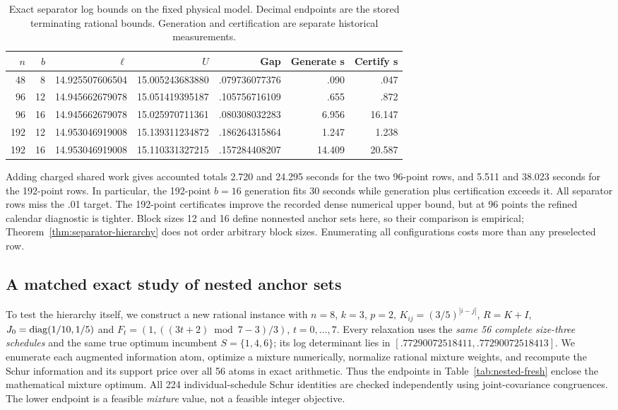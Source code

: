 \begin{table}[htbp]
\centering\small
\caption{Exact separator log bounds on the fixed physical model. Decimal
endpoints are the stored terminating rational bounds. Generation and
certification are separate historical measurements.}
\label{tab:separator-certificates}
\begin{tabular}{rrrrrrr}
\toprule
$n$ & $b$ & $\ell$ & $U$ & Gap & Generate s & Certify s\\
\midrule
48&8&14.925507606504&15.005243683880&.079736077376&.090&.047\\
96&12&14.945662679078&15.051419395187&.105756716109&.655&.872\\
96&16&14.945662679078&15.025970711361&.080308032283&6.956&16.147\\
192&12&14.953046919008&15.139311234872&.186264315864&1.247&1.238\\
192&16&14.953046919008&15.110331327215&.157284408207&14.409&20.587\\
\bottomrule
\end{tabular}
\end{table}

Adding charged shared work gives accounted totals 2.720 and 24.295 seconds
for the two 96-point rows, and 5.511 and 38.023 seconds for the 192-point rows.
In particular, the 192-point $b=16$ generation fits 30 seconds while generation
plus certification exceeds it. All separator rows miss the .01 target. The
192-point certificates improve the recorded dense numerical upper bound, but
at 96 points the refined calendar diagnostic is tighter. Block sizes 12 and
16 define nonnested anchor sets here, so their comparison is empirical;
Theorem~\ref{thm:separator-hierarchy} does not order arbitrary block sizes.
Enumerating all configurations costs more than any preselected row.

\subsection{A matched exact study of nested anchor sets}
\label{subsec:nested-experiment}

To test the hierarchy itself, we construct a new rational instance with
$n=8$, $k=3$, $p=2$, $K_{ij}=(3/5)^{|i-j|}$, $R=K+I$,
$J_0=\operatorname{diag}(1/10,1/5)$ and
$F_t=(1,((3t+2)\bmod7-3)/3)$, $t=0,\ldots,7$.
Every relaxation uses the \emph{same 56 complete size-three schedules} and
the same true optimum incumbent $S=\{1,4,6\}$; its log determinant lies in
$[.77290072518411,.77290072518413]$. We enumerate each augmented
information atom, optimize a mixture numerically, normalize rational mixture
weights, and recompute the Schur information and its support price over all
56 atoms in exact arithmetic. Thus the endpoints in
Table~\ref{tab:nested-fresh} enclose the mathematical mixture optimum.
All 224 individual-schedule Schur identities are checked independently using
joint-covariance congruences. The lower endpoint is a feasible \emph{mixture}
value, not a feasible integer objective.

